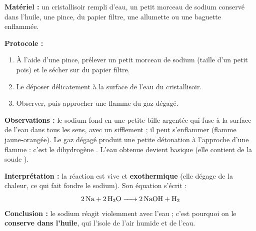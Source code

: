 \documentclass[11pt]{article}
\newcommand{\cle}[1]{{\popxbold\color{popdark}#1}}
\begin{document}
\begin{experience}
\textbf{Matériel :} un cristallisoir rempli d'eau, un petit morceau de sodium conservé dans l'huile, une pince, du papier filtre, une allumette ou une baguette enflammée.\par
\textbf{Protocole :}
\begin{enumerate}
\item À l'aide d'une pince, prélever un petit morceau de sodium (taille d'un petit pois) et le sécher sur du papier filtre.
\item Le déposer délicatement à la surface de l'eau du cristallisoir.
\item Observer, puis approcher une flamme du gaz dégagé.
\end{enumerate}
\textbf{Observations :} le sodium fond en une petite bille argentée qui fuse à la surface de l'eau dans tous les sens, avec un sifflement ; il peut s'enflammer (flamme jaune-orangée). Le gaz dégagé produit une petite détonation à l'approche d'une flamme : c'est le \cle{dihydrogène} . L'eau obtenue devient basique (elle contient de la soude ).\par
\textbf{Interprétation :} la réaction est vive et \textbf{exothermique} (elle dégage de la chaleur, ce qui fait fondre le sodium). Son équation s'écrit :
\[ \ce{2Na + 2H2O -> 2NaOH + H2} \]
\textbf{Conclusion :} le sodium réagit violemment avec l'eau ; c'est pourquoi on le \textbf{conserve dans l'huile}, qui l'isole de l'air humide et de l'eau.
\end{experience}
\end{document}

